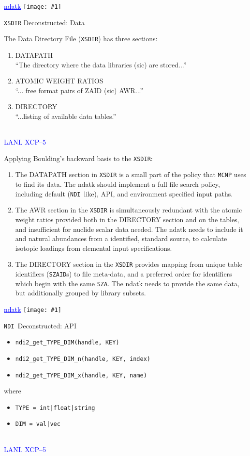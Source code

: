 \documentclass[clock]{slides}
\newenvironment{xslide}[1][logo.jpg]{\begin{slide} \tiny
\textcolor{blue}{\underline{ndatk}} \hfill
\texttt{[image: \#1]}
\normalsize}{\vfill\tiny
\textcolor{blue}{\hrulefill \\LANL XCP--5}
\end{slide}}
\newcommand{\NDI}{\texttt{NDI}}
\newcommand{\zaid}{\texttt{SZAID}}
\begin{document}
\begin{xslide}
\begin{center}\Large
\texttt{XSDIR} Deconstructed: Data
\end{center}
The Data Directory File (\texttt{XSDIR}) has three sections:
\begin{enumerate}
\item DATAPATH\\
  ``The directory where the data libraries (sic) are stored...''
\item ATOMIC WEIGHT RATIOS\\
  ``... free format pairs of ZAID (sic) AWR...''
\item DIRECTORY\\
``...listing of available data tables.''
\end{enumerate}
\end{xslide}

\begin{note}\small

Applying Boulding's backward basis to the \texttt{XSDIR}:
\begin{enumerate}
\item The DATAPATH section in \texttt{XSDIR} is a small part of the
  policy that \texttt{MCNP} uses to find its data.  The ndatk should
  implement a full file search policy, including default (\NDI\ like),
  API, and environment specified input paths.
\item The AWR section in the \texttt{XSDIR} is simultaneously
  redundant with the atomic weight ratios provided both in the
  DIRECTORY section and on the tables, and insufficient for nuclide
  scalar data needed.  The ndatk needs to include it and natural
  abundances from a identified, standard source, to calculate isotopic
  loadings from elemental input specifications.
\item The DIRECTORY section in the \texttt{XSDIR} provides mapping
  from unique table identifiers (\zaid s) to file meta-data, and a
  preferred order for identifiers which begin with the same \texttt{SZA}.  The
  ndatk needs to provide the same data, but additionally grouped by
  library subsets.
\end{enumerate}

\end{note}

\begin{xslide}
\begin{center}\Large
\NDI\ Deconstructed: API
\end{center}
\begin{itemize}
\item \verb+ndi2_get_TYPE_DIM(handle, KEY)+
\item \verb+ndi2_get_TYPE_DIM_n(handle, KEY, index)+
\item \verb+ndi2_get_TYPE_DIM_x(handle, KEY, name)+
\end{itemize}
where
\begin{itemize}
\item \verb+TYPE = int|float|string+
\item \verb+DIM = val|vec+
\end{itemize}
\end{xslide}
\end{document}
